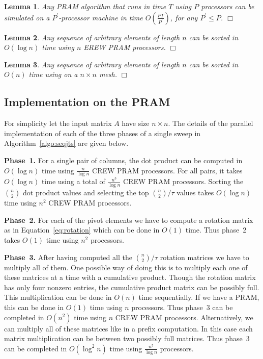 \documentclass[10pt, conference, compsocconf]{IEEEtran}
\newtheorem{lemma}{Lemma}
\begin{document}
\begin{lemma}
\label{slowdown}
Any PRAM algorithm that runs in time $T$ using $P$ processors
can be simulated on a $P^\prime$-processor machine in time
$O\left (\frac{PT}{P^\prime}\right )$, for any $P^\prime\leq P$. \hfill $\Box$
\end{lemma}

\begin{lemma}
\label{sort1}
Any  sequence of arbitrary elements of length $n$ can be sorted in
$O(\log n)$ time using $n$ EREW PRAM processors.
\hfill $\Box$
\end{lemma}

\begin{lemma}
\label{sort2}
Any  sequence of arbitrary elements of length $n$ can be sorted in
$O( n)$ time using on a $n\times n$ mesh.
\hfill $\Box$
\end{lemma}

\subsection{Implementation on the PRAM}

For simplicity let the input matrix $A$ have size $n\times n$. The details of the parallel implementation of each of the three phases of a single sweep in Algorithm~\ref{algo:seqjts} are given below.


\noindent \textbf{Phase~1.} For a single pair of columns, the dot product can be computed in $O(\log n)$ time using $\frac{n}{\log n}$ CREW PRAM processors. For all pairs, it takes $O(\log n)$ time using a total of $\frac{n^3}{\log n}$ CREW PRAM processors. Sorting the ${n}\choose{2}$ dot product values and selecting the top ${n\choose 2}/\tau$ values takes $O(\log n)$ time using $n^2$ CREW PRAM processors.

\noindent \textbf{Phase~2.} For each of the pivot elements we have to compute a rotation matrix as in Equation~\eqref{eq:rotation} which can be done in $O(1)$ time. Thus phase~2 takes $O(1)$ time using $n^2$ processors.

\noindent \textbf{Phase~3.} After having computed all the ${n\choose 2}/\tau$ rotation matrices we have to multiply all of them. One possible way of doing this is to multiply each one of these matrices at a time with a cumulative product. Though the rotation matrix has only four nonzero entries, the cumulative product matrix can be possibly full. This multiplication can be done in $O(n)$ time sequentially. If we have a PRAM, this can be done in $O(1)$ time using $n$ processors. Thus phase~3 can be completed in $O(n^2)$ time using $n$ CREW PRAM processors. Alternatively, we can multiply all of these matrices like in a prefix computation. In this case each matrix multiplication can be between two possibly full matrices. Thus phase~3 can be completed in $O(\log^2n)$ time using $\frac{n^5}{\log n}$ processors.
\end{document}
